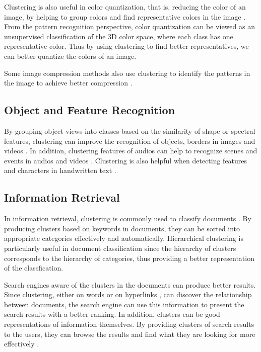 \documentclass[conference]{IEEEtran}
\begin{document}
Clustering is also useful in color quantization, that is, reducing the color of an image, by helping to group colors and find representative colors in the image \cite{scheunders1997comparison}. From the pattern recognition perspective, color quantization can be viewed as an unsupervised classification of the 3D color space, where each class has one representative color. Thus by using clustering to find better representatives, we can better quantize the colors of an image.

Some image compression methods also use clustering to identify the patterns in the image to achieve better compression \cite{jain1981image}.

\subsection{Object and Feature Recognition}
By grouping object views into classes based on the similarity of shape or spectral features, clustering can improve the recognition of objects, borders in images and videos \cite{lowe2004distinctive}. In addition, clustering features of audios can help to recognize scenes and events in audios and videos \cite{clarkson1999unsupervised} \cite{liu1998audio}. Clustering is also helpful when detecting features and characters in handwritten text \cite{lu1995machine} \cite{yin2009handwritten}.

\subsection{Information Retrieval}
In information retrieval, clustering is commonly used to classify documents \cite{willett1988recent} \cite{steinbach2000comparison}. By producing clusters based on keywords in documents, they can be sorted into appropriate categories effectively and automatically. Hierarchical clustering is particularly useful in document classification since the hierarchy of clusters corresponds to the hierarchy of categories, thus providing a better representation of the classfication.

Search engines aware of the clusters in the documents can produce better results. Since clustering, either on words or on hyperlinks \cite{weiss1996hypursuit} \cite{brin1998anatomy}, can discover the relationship between documents, the search engine can use this information to present the search results with a better ranking. In addition, clusters can be good representations of information themselves. By providing clusters of search results to the users, they can browse the results and find what they are looking for more effectively \cite{cutting1992scatter}.
\end{document}
